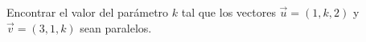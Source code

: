 Encontrar el valor del parámetro $k$ tal que los vectores $\vec{u} = (1, k, 2)$ y $\vec{v} = (3, 1, k)$ sean paralelos.